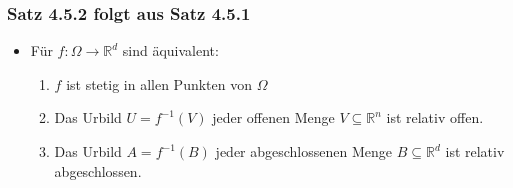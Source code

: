 \documentclass[a3paper, 11pt, landscape]{scrartcl}
\newcommand{\Rd}{\mathbb{R}^d}
\begin{document}
\begin{multicols*}{3}
	\subsubsection{Satz 4.5.2 folgt aus Satz 4.5.1}
	\begin{itemize}
	    \item Für $f:\Omega\to\Rd$ sind äquivalent:
	    \begin{enumerate}
	        \item $f$ ist stetig in allen Punkten von $\Omega$
	        \item Das Urbild $U=f^{-1}(V) $ jeder offenen Menge $V\subseteq \mathbb{R}^n$ ist relativ offen.
	        \item Das Urbild $A = f^{-1}(B)$ jeder abgeschlossenen Menge $B\subseteq\mathbb{R}^d$ ist relativ abgeschlossen.
	    \end{enumerate}
	\end{itemize}
	

\end{multicols*}
\end{document}
